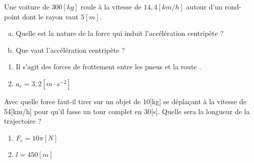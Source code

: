 \begin{exercise}
    Une voiture de \(300[kg]\) roule à la vitesse de \(14,4[km/h]\) autour d'un rond-point dont le rayon vaut \(5[m]\).
    \begin{enumerate}[a)]
        \item Quelle est la nature de la force qui induit l'accélération centripète ?
        \item Que vaut l'accélération centripète ?
    \end{enumerate}
\end{exercise}
\begin{solution}
    \begin{enumerate}[label=\alph*]
        \item Il s'agit des forces de frottement entre les pneus et la route .
        \item \(a_c=3,2[m \cdot s^{-2}] \)
    \end{enumerate}
\end{solution}

\begin{exercise}
    Avec quelle force faut-il tirer sur un objet de 10[kg] se déplaçant à la vitesse de 54[km/h] pour qu'il fasse un tour complet en 30[s]. Quelle sera la longueur de la trajectoire ?
\end{exercise}
\begin{solution}
    \begin{enumerate}[label=\alph*]
        \item \(F_c=10 \pi[N]\)
        \item \(l=450[m] \)
    \end{enumerate}
\end{solution}

\newpage

